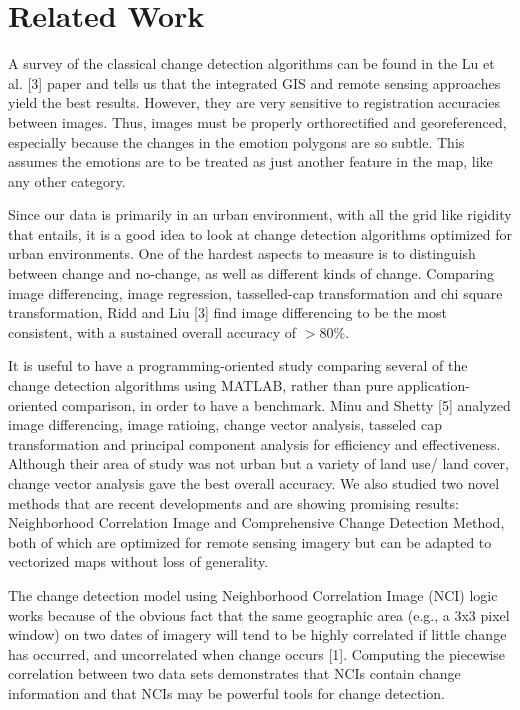 \documentclass[conference]{IEEEtran}
\begin{document}
\section{Related Work}

A survey of the classical change detection algorithms can be found in the Lu et al. [3] paper and tells us that the integrated GIS and remote sensing approaches yield the best results. However, they are very sensitive to registration accuracies between images. Thus, images must be properly orthorectified and georeferenced, especially because the changes in the emotion polygons are so subtle. This assumes the emotions are to be treated as just another feature in the map, like any other category.

Since our data is primarily in an urban environment, with all the grid like rigidity that entails, it is a good idea to look at change detection algorithms optimized for urban environments. One of the hardest aspects to measure is to distinguish between change and no-change, as well as different kinds of change. Comparing image differencing, image regression, tasselled-cap transformation and chi square transformation, Ridd and Liu [3] find image differencing to be the most consistent, with a sustained overall accuracy of 
$>$80\%.

It is useful to have a programming-oriented study comparing several of the change detection algorithms using MATLAB, rather than pure application-oriented comparison, in order to have a benchmark. Minu and Shetty [5] analyzed image differencing, image ratioing, change vector analysis, tasseled cap transformation and principal component analysis for efficiency and effectiveness. Although their area of study was not urban but a variety of land use/ land cover, change vector analysis gave the best overall accuracy.
We also studied two novel methods that are recent developments and are showing promising results: Neighborhood Correlation Image and Comprehensive Change Detection Method, both of which are optimized for remote sensing imagery but can be adapted to vectorized maps without loss of generality.

The change detection model using Neighborhood Correlation Image (NCI) logic works because of the obvious fact that the same geographic area (e.g., a 3x3 pixel window) on two dates of imagery will tend to be highly correlated if little change has occurred, and uncorrelated when change occurs [1]. Computing the piecewise correlation between two data sets demonstrates that NCIs contain change information and that NCIs may be powerful tools for change detection.
\end{document}
